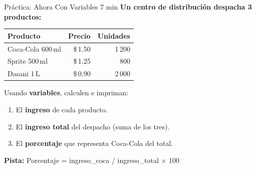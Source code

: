 \documentclass[aspectratio=169, 11pt]{beamer}
\begin{document}
\begin{frame}[fragile]{Práctica: Ahora Con Variables \hfill {\normalsize\color{arcaRed}\faClock\hspace{4pt}7 min}}
  \vspace{-6pt}
  {\small\color{arcaDark}\bfseries
    Un centro de distribución despacha 3 productos:}

  \vspace{4pt}
  \begin{center}
  {\footnotesize
  \renewcommand{\arraystretch}{1.2}
  \begin{tabular}{l r r}
    \toprule
    {\bfseries\color{arcaDark} Producto}
    & {\bfseries\color{arcaDark} Precio}
    & {\bfseries\color{arcaDark} Unidades} \\
    \midrule
    Coca-Cola 600\,ml & \$\,1.50 & 1\,200 \\
    Sprite 500\,ml    & \$\,1.25 &   800 \\
    Dasani 1\,L       & \$\,0.90 & 2\,000 \\
    \bottomrule
  \end{tabular}
  }
  \end{center}

  \vspace{6pt}
  {\footnotesize\color{textMuted}
    Usando \textbf{variables}, calculen e impriman:}

  \vspace{2pt}
  {\footnotesize
  \begin{enumerate}\setlength{\itemsep}{2pt}
    \item[{\color{arcaRed}\bfseries 1.}]
      El \textbf{ingreso} de cada producto.
    \item[{\color{arcaRed}\bfseries 2.}]
      El \textbf{ingreso total} del despacho (suma de los tres).
    \item[{\color{arcaRed}\bfseries 3.}]
      El \textbf{porcentaje} que representa Coca-Cola del total.
  \end{enumerate}
  }

  \vspace{4pt}
  {\scriptsize\color{textMuted}
    \faLightbulb[regular]\hspace{4pt}\textbf{Pista:}
    Porcentaje = ingreso\_coca / ingreso\_total $\times$ 100}
\end{frame}
\end{document}
